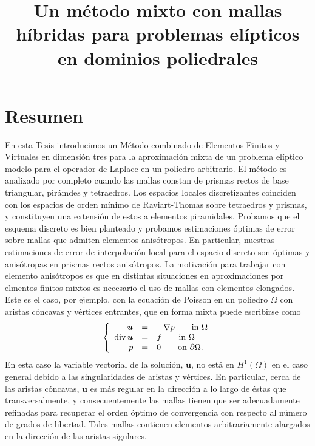 \documentclass{article}
\date{}
\newcommand\dv{\mbox{div\,}}
\begin{document}
\title{Un m\'etodo mixto con mallas h\'ibridas para problemas el\'ipticos
en dominios poliedrales}


\maketitle
\vspace{4cm}
\section*{Resumen}
En esta Tesis introducimos un M\'etodo combinado
de Elementos Finitos y Virtuales en dimensi\'on tres 
para
la aproximaci\'on mixta 
de un problema el\'iptico modelo para el operador
de Laplace en un poliedro arbitrario.
El m\'etodo es analizado por completo
cuando las mallas constan de prismas rectos de base triangular, pir\'amdes y tetraedros. Los espacios locales
discretizantes coinciden con los espacios de orden m\'inimo
de Raviart-Thomas 
sobre tetraedros y prismas, y constituyen una extensi\'on
de estos a elementos piramidales. Probamos que el 
esquema discreto es bien planteado y 
probamos estimaciones \'optimas de error
sobre mallas 
que admiten elementos anis\'otropos. En particular, 
 nuestras estimaciones de 
error
de 
interpolaci\'on 
local 
para el espacio discreto son \'optimas y 
anis\'otropas en prismas rectos anis\'otropos. La motivaci\'on
para trabajar con elemento anis\'otropos es que en
distintas situaciones en aproximaciones por elmentos finitos mixtos
es necesario el uso de mallas con elementos elongados.
Este es el caso, por ejemplo, con la ecuaci\'on de Poisson en un
poliedro $\Omega$ con aristas c\'oncavas y v\'ertices entrantes,
que en forma mixta puede escribirse como
\begin{equation*}\label{mf} \left\{\begin{array}{rcl}
\boldsymbol{u}&=&-\nabla p\qquad \mbox{in }\Omega\\
\dv\boldsymbol{u}&=&f\qquad \mbox{in }\Omega\\
p&=&0\qquad\mbox{on }\partial\Omega.\end{array}\right.
\end{equation*}
En esta caso la variable vectorial de la soluci\'on, $\boldsymbol{u}$,
no est\'a en $H^1(\Omega)$ en el caso general debido a las singularidades 
de aristas y v\'ertices. En particular, cerca de las aristas c\'oncavas,
$\boldsymbol{u}$ es m\'as regular en la direcci\'on a lo largo de \'estas
que transversalmente, y consecuentemente las mallas tienen que ser
adecuadamente refinadas para recuperar el orden \'optimo de convergencia
con respecto al n\'umero de grados de libertad. Tales mallas  contienen
elementos arbitrariamente alargados en la direcci\'on de las aristas sigulares.
\end{document}
